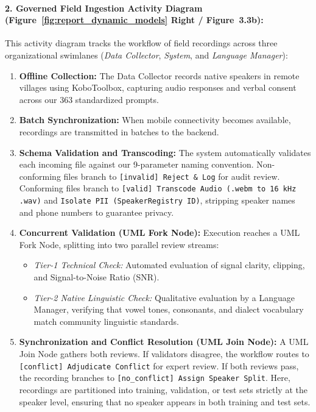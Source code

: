 \documentclass[a4paper,11pt]{article}
\begin{document}
\paragraph{2. Governed Field Ingestion Activity Diagram (Figure~\ref{fig:report_dynamic_models} Right / Figure~3.3b):}
This activity diagram tracks the workflow of field recordings across three organizational swimlanes (\textit{Data Collector}, \textit{System}, and \textit{Language Manager}):
\begin{enumerate}
    \item \textbf{Offline Collection:} The Data Collector records native speakers in remote villages using KoboToolbox, capturing audio responses and verbal consent across our 363 standardized prompts.
    \item \textbf{Batch Synchronization:} When mobile connectivity becomes available, recordings are transmitted in batches to the backend.
    \item \textbf{Schema Validation and Transcoding:} The system automatically validates each incoming file against our 9-parameter naming convention. Non-conforming files branch to \texttt{[invalid] Reject \& Log} for audit review. Conforming files branch to \texttt{[valid] Transcode Audio (.webm to 16\,kHz .wav)} and \texttt{Isolate PII (SpeakerRegistry ID)}, stripping speaker names and phone numbers to guarantee privacy.
    \item \textbf{Concurrent Validation (UML Fork Node):} Execution reaches a UML Fork Node, splitting into two parallel review streams:
    \begin{itemize}
        \item \textit{Tier-1 Technical Check:} Automated evaluation of signal clarity, clipping, and Signal-to-Noise Ratio (SNR).
        \item \textit{Tier-2 Native Linguistic Check:} Qualitative evaluation by a Language Manager, verifying that vowel tones, consonants, and dialect vocabulary match community linguistic standards.
    \end{itemize}
    \item \textbf{Synchronization and Conflict Resolution (UML Join Node):} A UML Join Node gathers both reviews. If validators disagree, the workflow routes to \texttt{[conflict] Adjudicate Conflict} for expert review. If both reviews pass, the recording branches to \texttt{[no\_conflict] Assign Speaker Split}. Here, recordings are partitioned into training, validation, or test sets strictly at the speaker level, ensuring that no speaker appears in both training and test sets.
\end{enumerate}
\end{document}
